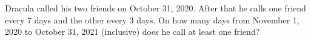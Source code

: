 Dracula called his two friends on October 31, 2020. After that he calls one friend every $7$ days and the other every $3$ days. On how many days from November 1, 2020 to October 31, 2021 (inclusive) does he call at least one friend?
